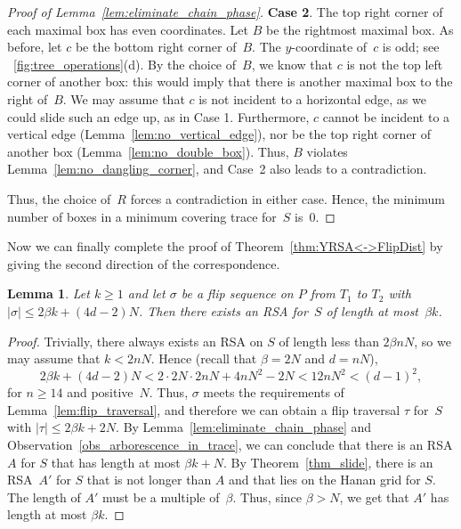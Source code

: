 \documentclass[a4paper,11pt]{article}
\newtheorem{lemma}[theorem]{Lemma}
\newcommand{\qedopt}{}
\begin{document}
\begin{proof}[Proof of Lemma~\ref{lem:eliminate_chain_phase}]
\noindent\textbf{Case 2}.
The top right corner of each maximal box has even coordinates.
Let $B$ be the rightmost maximal box.
As before, let $c$ be the bottom right corner of~$B$.
The $y$-coordinate of~$c$ is odd; see \figurename~\ref{fig:tree_operations}(d).
By the choice of~$B$, we know that $c$ is not the top left corner of another box: this would imply that there is another maximal box to the right of~$B$.
We may assume that $c$ is not incident to a horizontal edge, as we could slide such an edge up, as in Case 1.
Furthermore, $c$ cannot be incident to a vertical edge (Lemma~\ref{lem:no_vertical_edge}), nor be the top right corner of another box (Lemma~\ref{lem:no_double_box}).
Thus, $B$ violates Lemma~\ref{lem:no_dangling_corner}, and Case~2 also leads to a contradiction.

Thus, the choice of~$R$ forces a contradiction in either case.
Hence, the minimum number of boxes in a minimum covering trace for~$S$ is~$0$.
\end{proof}

\noindent
Now we can finally complete the proof of Theorem~\ref{thm:YRSA<->FlipDist} by giving the second direction of the correspondence.

\begin{lemma}\label{lem:flip_tour->YRTSP}
Let $k \geq 1$ and
let $\sigma$ be a flip sequence on $P$ from $T_1$ to
$T_2$ with $|\sigma| \leq 2 \beta k + (4d-2)N$.
Then there exists an RSA for~$S$ of length at most~$\beta k$.
\end{lemma}
\begin{proof}
Trivially, there always exists an RSA on $S$ of length less than $2\beta nN$, so we may assume that 
$k < 2nN$.  Hence (recall that $\beta = 2N$ and $d = nN$),
\[
2\beta k + (4d-2)N < 2 \cdot 2N \cdot 2nN + 4 nN^2 -2N < 12nN^2 <  (d-1)^2,
\] 
for $n \geq 14$ and positive~$N$.
Thus, $\sigma$ meets the requirements of Lemma~\ref{lem:flip_traversal}, and therefore
we can obtain a flip traversal $\tau$ for~$S$ with $|\tau| \leq 2\beta k + 2N$.
By Lemma~\ref{lem:eliminate_chain_phase} and Observation~\ref{obs_arborescence_in_trace},
we can conclude that there is an RSA $A$ for $S$ 
that has length at most $\beta k + N$. 
By Theorem~\ref{thm_slide}, there is an RSA~$A'$ for $S$ that is not 
longer than $A$ and that lies on 
the Hanan grid for $S$. The length of $A'$ must be a multiple of~$\beta$.
Thus, since $\beta > N$, we get that $A'$ has length at most $\beta k$.
\qedopt
\end{proof}
\end{document}
